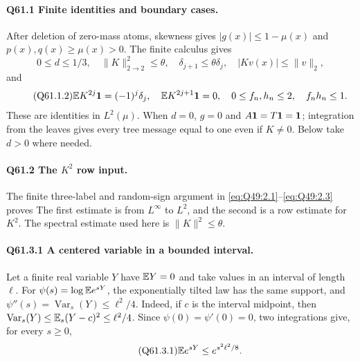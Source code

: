 \paragraph{Q61.1 Finite identities and boundary cases.}
After deletion of zero-mass atoms, skewness gives
\(|g(x)|\le\allowbreak 1-\mu(x)\) and \(p(x),\allowbreak q(x)\ge\allowbreak \mu(x)>\allowbreak 0\).
The finite calculus gives
\begin{equation}\tag{Q61.1.1}\label{eq:Q61:1.1}
0\le d\le1/3,\quad\|K\|_{2\to2}^2\le\theta,\quad
\delta_{j+1}\le\theta\delta_j,\quad |Kv(x)|\le\|v\|_2,
\end{equation}
and
\begin{equation}\tag{Q61.1.2}\label{eq:Q61:1.2}
\mathbb E K^{2j}\mathbf1=(-1)^j\delta_j,\quad\mathbb E K^{2j+1}\mathbf1=0,\quad
0\le f_n,h_n\le2,\quad f_nh_n\le1.
\end{equation}
These are identities in \(L^2(\mu)\). When \(d=\allowbreak 0\), \(g=\allowbreak 0\) and
\(A\mathbf1=\allowbreak T\mathbf1=\allowbreak \mathbf1\); integration from the leaves gives every tree
message equal to one even if \(K\ne0\). Below take \(d>\allowbreak 0\) where needed.

\paragraph{Q61.2 The \(K^2\) row input.}
The finite three-label and random-sign argument in
\eqref{eq:Q49:2.1}--\eqref{eq:Q49:2.3} proves
The first estimate is from \(L^\infty\) to \(L^2\), and the second
is a row estimate for \(K^2\). The spectral estimate used here is
\(\|K\|^2\le\allowbreak \theta\).

\paragraph{Q61.3.1 A centered variable in a bounded interval.}
Let a finite real variable \(Y\) have \(\mathbb E Y=\allowbreak 0\) and take values in
an interval of length \(\ell\). For \(\psi(s)=\allowbreak \log\mathbb E e^{sY}\), the
exponentially tilted law has the same support, and
\(\psi''(s)=\allowbreak \operatorname{Var}_s(Y)\le\allowbreak \ell^2/4\).
Indeed, if \(c\) is the interval midpoint, then
\(\operatorname{Var}_s(Y)\le\allowbreak \mathbb E_s(Y-c)^2\le\allowbreak \ell^2/4\).
Since \(\psi(0)=\allowbreak \psi'(0)=\allowbreak 0\), two integrations give, for every \(s\ge\allowbreak 0\),
\begin{equation}\tag{Q61.3.1}\label{eq:Q61:3.1}
\mathbb E e^{sY}\le e^{s^2\ell^2/8}.
\end{equation}

